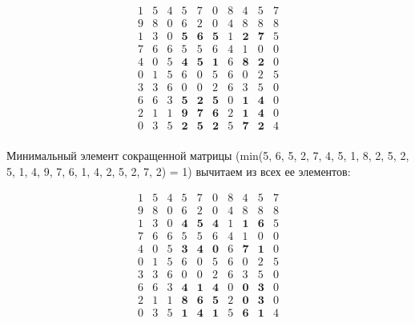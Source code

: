 \documentclass[17pt]{extarticle}
\begin{document}
\[
    \begin{array}{*{10}{c}}
        1 & 5 & 4 & 5          & 7          & 0          & 8 & 4          & 5          & 7 \\
        9 & 8 & 0 & 6          & 2          & 0          & 4 & 8          & 8          & 8 \\
        1 & 3 & 0 & \textbf{5} & \textbf{6} & \textbf{5} & 1 & \textbf{2} & \textbf{7} & 5 \\
        7 & 6 & 6 & 5          & 5          & 6          & 4 & 1          & 0          & 0 \\
        4 & 0 & 5 & \textbf{4} & \textbf{5} & \textbf{1} & 6 & \textbf{8} & \textbf{2} & 0 \\
        0 & 1 & 5 & 6          & 0          & 5          & 6 & 0          & 2          & 5 \\
        3 & 3 & 6 & 0          & 0          & 2          & 6 & 3          & 5          & 0 \\
        6 & 6 & 3 & \textbf{5} & \textbf{2} & \textbf{5} & 0 & \textbf{1} & \textbf{4} & 0 \\
        2 & 1 & 1 & \textbf{9} & \textbf{7} & \textbf{6} & 2 & \textbf{1} & \textbf{4} & 0 \\
        0 & 3 & 5 & \textbf{2} & \textbf{5} & \textbf{2} & 5 & \textbf{7} & \textbf{2} & 4 \\
    \end{array}
\]

Минимальный элемент сокращенной матрицы (min(5, 6, 5, 2, 7, 4, 5, 1, 8, 2, 5, 2, 5, 1, 4, 9, 7, 6, 1, 4, 2, 5, 2, 7, 2) = 1) вычитаем из всех ее элементов:

\[
    \begin{array}{*{10}{c}}
        1 & 5 & 4 & 5          & 7          & 0          & 8 & 4          & 5          & 7 \\
        9 & 8 & 0 & 6          & 2          & 0          & 4 & 8          & 8          & 8 \\
        1 & 3 & 0 & \textbf{4} & \textbf{5} & \textbf{4} & 1 & \textbf{1} & \textbf{6} & 5 \\
        7 & 6 & 6 & 5          & 5          & 6          & 4 & 1          & 0          & 0 \\
        4 & 0 & 5 & \textbf{3} & \textbf{4} & \textbf{0} & 6 & \textbf{7} & \textbf{1} & 0 \\
        0 & 1 & 5 & 6          & 0          & 5          & 6 & 0          & 2          & 5 \\
        3 & 3 & 6 & 0          & 0          & 2          & 6 & 3          & 5          & 0 \\
        6 & 6 & 3 & \textbf{4} & \textbf{1} & \textbf{4} & 0 & \textbf{0} & \textbf{3} & 0 \\
        2 & 1 & 1 & \textbf{8} & \textbf{6} & \textbf{5} & 2 & \textbf{0} & \textbf{3} & 0 \\
        0 & 3 & 5 & \textbf{1} & \textbf{4} & \textbf{1} & 5 & \textbf{6} & \textbf{1} & 4 \\
    \end{array}
\]
\end{document}
